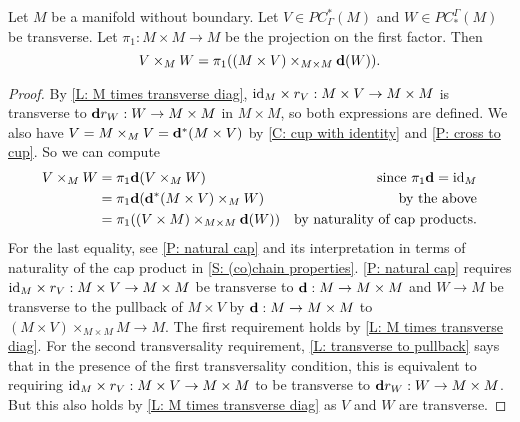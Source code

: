 \begin{lemma}\label{L: diagonal version of intersection}
Let $M$ be a manifold without boundary. Let $V\in PC^*_\Gamma(M)$ and $W\in PC_*^\Gamma(M)$ be transverse. Let $\pi_1:M\times M\to M$ be the projection on the first factor. Then $$V\times_M W=\pi_1((M\times V)\times_{M\times M} \mathbf{d}(W)).$$
\end{lemma}
\begin{proof}
By \cref{L: M times transverse diag}, $\mathrm{id}_M\times r_V:M\times V\to M\times M$ is transverse to $\mathbf{d} r_W:W\to M\times M$ in $M\times M$, so both expressions are defined. We also have $V=M\times_M V=\mathbf{d}^*(M\times V)$ by \cref{C: cup with identity} and \cref{P: cross to cup}.
So we can compute
\begin{align*}
V\times_M W&=\pi_1\mathbf{d} (V\times_M W)&\text{since $\pi_1\mathbf{d}=\mathrm{id}_M$}\\
&=\pi_1\mathbf{d} (\mathbf{d}^*(M\times V)\times_M W)&\text{by the above}\\
&=\pi_1((V\times M)\times_{M\times M}\mathbf{d}(W))&\text{by naturality of cap products.}
\end{align*}
For the last equality, see \cref{P: natural cap} and its interpretation in terms of naturality of the cap product in \cref{S: (co)chain properties}. \cref{P: natural cap} requires $\mathrm{id}_M\times r_V:M\times V\to M\times M$ be transverse to $\mathbf{d}:M\to M\times M$ and $W\to M$ be transverse to the pullback of $M\times V$ by $\mathbf{d}:M\to M\times M$ to
$(M\times V)\times_{M\times M}M\to M$.
The first requirement holds by \cref{L: M times transverse diag}. For the second transversality requirement, \cref{L: transverse to pullback} says that in the presence of the first transversality condition, this is equivalent to requiring $\mathrm{id}_M\times r_V:M\times V\to M\times M$ to be transverse to $\mathbf{d} r_W:W\to M\times M$. But this also holds by \cref{L: M times transverse diag} as $V$ and $W$ are transverse.
\end{proof}


